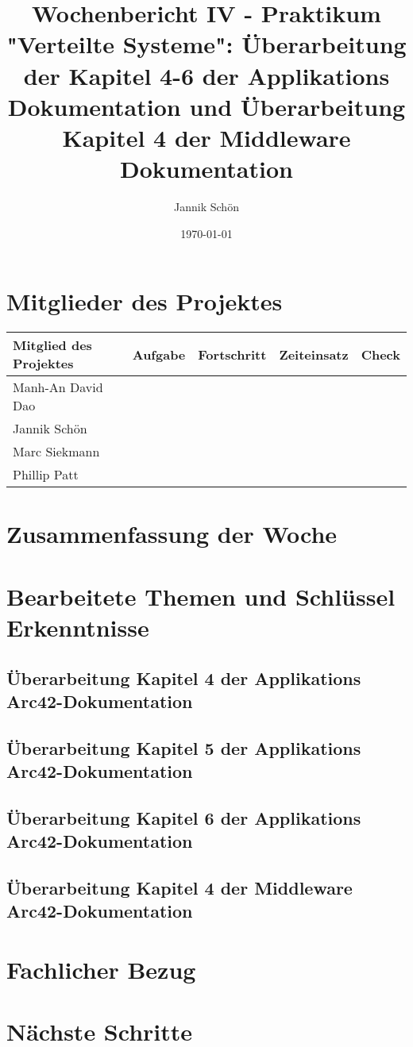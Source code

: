 \documentclass{article}
\title{Wochenbericht IV - Praktikum "Verteilte Systeme": Überarbeitung der Kapitel 4-6 der Applikations Dokumentation und Überarbeitung Kapitel 4 der Middleware Dokumentation}
\author{Jannik Schön}
\date{\today}
\begin{document}
\maketitle
\section{Mitglieder des Projektes }

\begin{tabular}{>{\raggedright\arraybackslash}p{3cm} >{\raggedright\arraybackslash}p{4cm} >{\centering\arraybackslash}p{2cm} >{\centering\arraybackslash}p{2cm} >{\raggedright\arraybackslash}p{3cm}}
\toprule
\textbf{Mitglied des Projektes} & \textbf{Aufgabe} & \textbf{Fortschritt} & \textbf{Zeiteinsatz} & \textbf{Check} \\
\midrule
Manh-An David Dao &  &  &  &  \\
\hline
Jannik Schön &  &  &  &  \\
\hline
Marc Siekmann &  &  &  &  \\
\hline
Phillip Patt & & & & \\

\bottomrule
\end{tabular}

\section{Zusammenfassung der Woche}

\section{Bearbeitete Themen und Schlüssel Erkenntnisse}

\subsection{Überarbeitung Kapitel 4 der Applikations Arc42-Dokumentation}



\subsection{Überarbeitung Kapitel 5 der Applikations Arc42-Dokumentation}




\subsection{Überarbeitung Kapitel 6 der Applikations Arc42-Dokumentation}

\subsection{Überarbeitung Kapitel 4 der Middleware Arc42-Dokumentation} 





\section{Fachlicher Bezug}






\clearpage


\section{Nächste Schritte}
\end{document}
